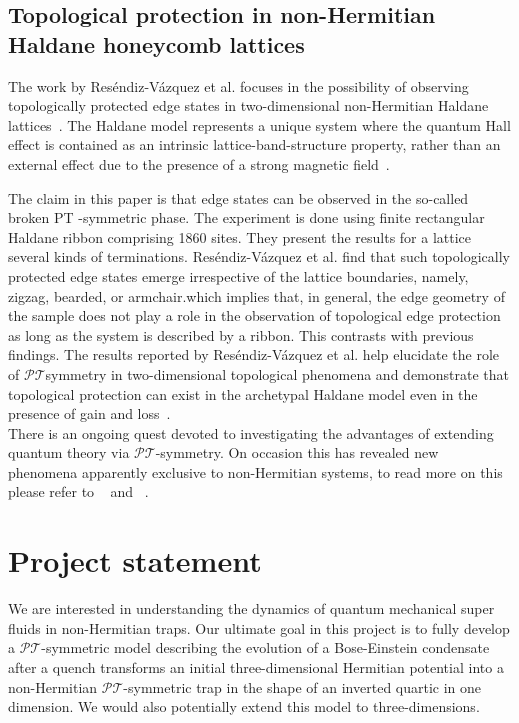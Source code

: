 \documentclass[12pt, a4paper]{report}
\newcommand\PT{\(\mathcal{PT}\)}
\begin{document}
\section{Topological protection in non-Hermitian Haldane honeycomb lattices}\label{TopoProtecc}
The work by Res\'endiz-V\'azquez et al. focuses in the possibility of observing topologically protected
edge states in two-dimensional non-Hermitian Haldane lattices~\cite{Tprotecc}.
The Haldane model represents a unique system where the quantum Hall effect is contained as an intrinsic lattice-band-structure property, rather than an external effect due to the presence of a strong magnetic
field~\cite{QuantumAnomalousEffect}. 

The claim in this paper is that edge states can be observed in the so-called broken PT -symmetric phase. 
The experiment is done using finite rectangular Haldane ribbon comprising 1860 sites. They present
the results for a lattice several kinds of terminations. Res\'endiz-V\'azquez et al. find that such topologically protected edge states emerge irrespective of the lattice boundaries, namely, zigzag, bearded, or armchair.which implies that, in general, the edge geometry of the sample does not play a role in the observation of topological edge protection as long as the system is described by a ribbon. This contrasts with previous findings. The results reported by Res\'endiz-V\'azquez et al. help elucidate the role of
\PT symmetry in two-dimensional topological phenomena and demonstrate that topological protection can exist in the archetypal Haldane model even in the presence of gain and loss~\cite{Tprotecc}.\\

There is an ongoing quest devoted to investigating the advantages of extending quantum theory via \PT-symmetry. On occasion this has revealed new phenomena apparently exclusive to non-Hermitian systems, to read more on this please refer to ~\cite{EigenspaceEPs} and ~\cite{NHQuantumHall}.

\chapter{Project statement}\label{MINE}
We are interested in understanding the dynamics of quantum mechanical super fluids in non-Hermitian traps. Our ultimate goal in this project is to fully develop a \PT-symmetric model describing the evolution of a Bose-Einstein condensate after a quench transforms an initial three-dimensional Hermitian potential into a non-Hermitian \PT-symmetric trap in the shape of an inverted quartic in one dimension. We would also potentially extend this model to three-dimensions. 
\end{document}
